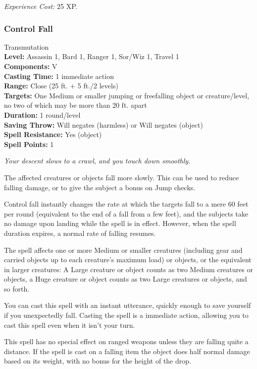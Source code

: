\emph{Experience Cost:} 25 XP.
\subsubsection{Control Fall}
\label{Spell:ControlFall}
Transmutation
\\ \textbf{Level:} Assassin 1, Bard 1, Ranger 1, Sor/Wiz 1, Travel 1
\\ \textbf{Components:} V
\\ \textbf{Casting Time:} 1 immediate action
\\ \textbf{Range:} Close (25 ft. + 5 ft./2 levels)
\\ \textbf{Targets:} One Medium or smaller jumping or freefalling object or creature/level, no two of which may be more than 20 ft. apart
\\ \textbf{Duration:} 1 round/level
\\ \textbf{Saving Throw:} Will negates (harmless) or Will negates (object)
\\ \textbf{Spell Resistance:} Yes (object)
\\ \textbf{Spell Points:} 1

\emph{Your descent slows to a crawl, and you touch down smoothly.}

The affected creatures or objects fall more slowly. This can be used to reduce falling damage, or to give the subject a bonus on Jump checks. 

Control fall instantly changes the rate at which the targets fall to a mere 60 feet per round (equivalent to the end of a fall from a few feet), 
and the subjects take no damage upon landing while the spell is in effect. However, when the spell duration expires, a normal rate of falling resumes.

The spell affects one or more Medium or smaller creatures (including gear and carried objects up to each creature's maximum load) or objects, 
or the equivalent in larger creatures: 
A Large creature or object counts as two Medium creatures or objects, a Huge creature or object counts as two Large creatures or objects, and so forth.

You can cast this spell with an instant utterance, quickly enough to save yourself if you unexpectedly fall. 
Casting the spell is a immediate action, allowing you to cast this spell even when it isn't your turn.

This spell has no special effect on ranged weapons unless they are falling quite a distance. 
If the spell is cast on a falling item the object does half normal damage based on its weight, with no bonus for the height of the drop.

